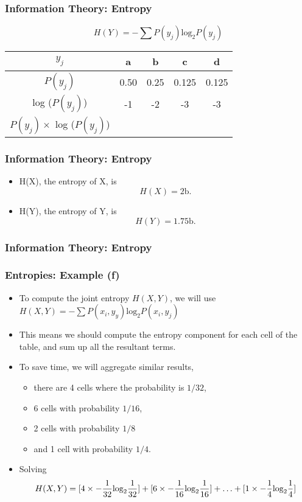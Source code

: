 ﻿\documentclass[a4]{beamer}
\begin{document}
 \begin{frame}
 \frametitle{Information Theory: Entropy}
 \LARGE
 \vspace{-1cm}
  \[H(Y) = -\sum P(y_j) \mbox{log}_2P(y_j)\]
 \begin{center}
 \LARGE
 \begin{tabular}{|c|c|c|c|c|}
 \hline $y_j$ & a & b & c & d \\ 
  \hline $P(y_j)$ & 0.50 & 0.25 & 0.125 & 0.125 \\  
 \hline log ($P(y_j)$) & -1 & -2 & -3 & -3 \\ 
 \hline $P(y_j) \times$ log ($P(y_j)$)&  &  &  &  \\ 
 \hline 
 \end{tabular} 
 \end{center}
 

\end{frame}
\begin{frame}
\frametitle{Information Theory: Entropy}
\Large
\begin{itemize}
\item H(X), the entropy of X, is 
\[H(X) = 2 \mbox{b}.\] 
\item H(Y), the entropy of Y, is 
\[H(Y) = 1.75 \mbox{b}.\] 
\end{itemize}
\end{frame}
\begin{frame}
\frametitle{Information Theory: Entropy}
\Large

\end{frame}
\begin{frame}
\frametitle{Entropies: Example (f)}
\begin{itemize}

\item To compute the joint entropy $H(X,Y)$,  we will use $H(X,Y) = -\sum P(x_i,y_y) \mbox{log}_2P(x_i,y_j)$
\bigskip
\item This means we should compute the entropy component for each cell of the table, and sum up all the resultant terms.
\bigskip
\item To save time, we will aggregate similar results, \begin{itemize} \item there are 4 cells where the probability is $1/32$,\item 6 cells with probability $1/16$, \item 2 cells with probability $1/8$ \item and 1 cell with probability $1/4$. \end{itemize}
\item Solving
\[ H(X,Y) = [4 \times -{1\over 32} \mbox{log}_2 {1\over 32} ] + [6 \times -{1\over 16} \mbox{log}_2 {1\over 16} ] + \ldots + [1 \times -{1\over 4} \mbox{log}_2 {1\over 4} ] \]
\end{itemize}
\end{frame}
\end{document}
